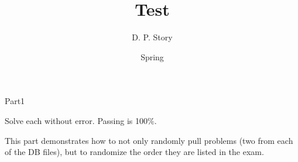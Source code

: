 \documentclass{article}
\title[T\nExam]{Test \nExam}
\author{D. P. Story}
\date{Spring \the\year}
\begin{document}
\maketitle

\begin{exam}{Part1}

\begin{instructions}
Solve each without error. Passing is 100\%.

\medskip\noindent
This part demonstrates how to not only randomly pull problems (two from each of the DB files), but
to randomize the order they are listed in the exam.
\end{instructions}

{%
  {}
  {}
  {}
  {}
}

\end{exam}
\end{document}
